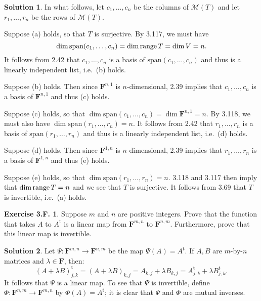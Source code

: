 \documentclass[12pt]{article}
\theoremstyle{definition}
\theoremstyle{exercise}
\newtheorem{exercise}{Exercise 3.F.}
\theoremstyle{solution}
\newtheorem*{solution}{Solution}
\newcommand{\mat}{\mathcal{M}}
\newcommand{\Span}{\text{span}}
\newcommand{\Range}{\text{range\,}}
\newcommand{\tpose}[1]{#1^{\text{t}}}
\newcommand{\F}{\mathbf{F}}
\begin{document}
\begin{solution}
    In what follows, let \( c_1, \ldots, c_n \) be the columns of \( \mat(T) \) and let \( r_1, \ldots, r_n \) be the rows of \( \mat(T) \).

    Suppose (a) holds, so that \( T \) is surjective. By 3.117, we must have
    \[
        \dim \Span(c_1, \ldots, c_n) = \dim \Range T = \dim V = n.
    \]
    It follows from 2.42 that \( c_1, \ldots, c_n \) is a basis of \( \Span(c_1, \ldots, c_n) \) and thus is a linearly independent list, i.e.\ (b) holds.

    Suppose (b) holds. Then since \( \F^{n,1} \) is \( n \)-dimensional, 2.39 implies that \( c_1, \ldots, c_n \) is a basis of \( \F^{n,1} \) and thus (c) holds.

    Suppose (c) holds, so that \( \dim \Span(c_1, \ldots, c_n) = \dim \F^{n,1} = n \). By 3.118, we must also have \( \dim \Span(r_1, \ldots, r_n) = n \). It follows from 2.42 that \( r_1, \ldots, r_n \) is a basis of \( \Span(r_1, \ldots, r_n) \) and thus is a linearly independent list, i.e.\ (d) holds.

    Suppose (d) holds. Then since \( \F^{1,n} \) is \( n \)-dimensional, 2.39 implies that \( r_1, \ldots, r_n \) is a basis of \( \F^{1,n} \) and thus (e) holds.

    Suppose (e) holds, so that \( \dim \Span(r_1, \ldots, r_n) = n \). 3.118 and 3.117 then imply that \( \dim \Range T = n \) and we see that \( T \) is surjective. It follows from 3.69 that \( T \) is invertible, i.e.\ (a) holds.
\end{solution}

\begin{exercise}
\label{ex:33}
    Suppose \( m \) and \( n \) are positive integers. Prove that the function that takes \( A \) to \( \tpose{A} \) is a linear map from \( \F^{m,n} \) to \( \F^{n,m} \). Furthermore, prove that this linear map is invertible.
\end{exercise}

\begin{solution}
    Let \( \Psi : \F^{m,n} \to \F^{n,m} \) be the map \( \Psi(A) = \tpose{A} \). If \( A, B \) are \(m\)-by-\(n\) matrices and \( \lambda \in \F \), then:
    \[
        \tpose{(A + \lambda B)}_{j,k} = (A + \lambda B)_{k,j} = A_{k,j} + \lambda B_{k,j} = \tpose{A}_{j,k} + \lambda \tpose{B}_{j,k}.
    \]
    It follows that \( \Psi \) is a linear map. To see that \( \Psi \) is invertible, define \( \Phi : \F^{n,m} \to \F^{m,n} \) by \( \Phi(A) = \tpose{A} \); it is clear that \( \Psi \) and \( \Phi \) are mutual inverses.
\end{solution}
\end{document}
